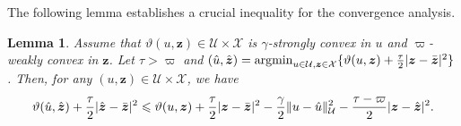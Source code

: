 \documentclass[10pt,reqno]{amsart}
\newcommand{\argmin}{\operatorname{argmin}}
\newcommand{\1}{{\chi}}
\def\leq{\leqslant}
\numberwithin{equation}{section}
\theoremstyle{thmlemcorr}
\numberwithin{theorem}{section}
\newtheorem{lemma}[theorem]{Lemma}
\theoremstyle{thmlemcorr*}
\theoremstyle{defi}
\theoremstyle{remexample}
\theoremstyle{ass}
\begin{document}
The following lemma establishes a crucial inequality for the convergence analysis.
\begin{lemma}
	\label{wc3plemma}
	Assume that $\vartheta(u, \boldsymbol{z})\in \mathcal{U}\times \mathcal{X}$ is $\gamma$-strongly convex in $u$ and $\varpi$-weakly convex in $\boldsymbol{z}$. Let $\tau>\varpi$ and
		$(\hat{u}, \hat{\boldsymbol{z}})=\argmin_{u\in \mathcal{U}, \boldsymbol{z}\in \mathcal{X}}\{\vartheta(u, \boldsymbol{z}) + \frac{\tau}{2}|\boldsymbol{z}-\Bar{\boldsymbol{z}}|^2\}$.
	Then, for any $(u, \boldsymbol{z})\in \mathcal{U}\times\mathcal{X}$, we have
	\begin{align}
		\label{wc3plemmafml}
		\vartheta(\hat{u}, \hat{\boldsymbol{z}}) + \frac{\tau}{2}|\hat{\boldsymbol{z}}-\Bar{\boldsymbol{z}}|^2 \leq \vartheta(u, \boldsymbol{z}) + \frac{\tau}{2}|\boldsymbol{z}-\Bar{\boldsymbol{z}}|^2 - \frac{\gamma}{2}\|u - \hat{u}\|^2_{\mathcal{U}} - \frac{\tau - \varpi}{2}|\boldsymbol{z} - \hat{\boldsymbol{z}}|^2. 
	\end{align}
\end{lemma}
\end{document}
